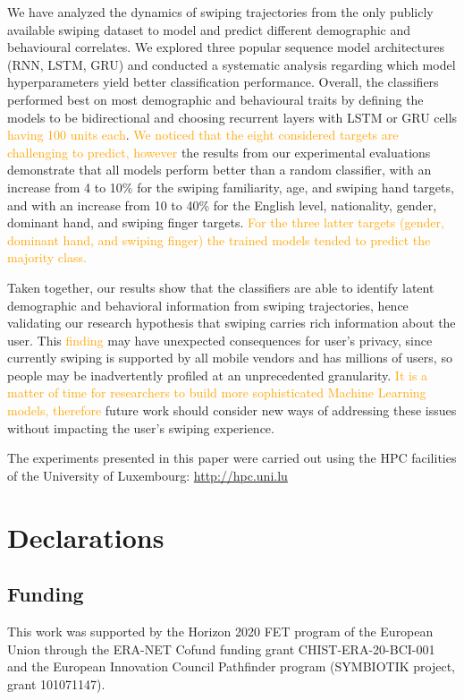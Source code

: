 \documentclass[sn-mathphys, pdflatex]{sn-jnl}
\newcommand{\rev}[1]{\textcolor{orange}{#1}}
\begin{document}
We have analyzed the dynamics of swiping trajectories from the only publicly available swiping dataset
to model and predict different demographic and behavioural correlates.
We explored three popular sequence model architectures (RNN, LSTM, GRU)
and conducted a systematic analysis regarding which model hyperparameters yield better classification performance.
Overall, the classifiers performed best on most demographic and behavioural traits
by defining the models to be bidirectional and choosing recurrent layers with LSTM or GRU cells \rev{having 100 units each}.
\rev{We noticed that the eight considered targets are challenging to predict, however}
the results from our experimental evaluations demonstrate that all models perform better than a random classifier,
with an increase from 4 to 10\% for the swiping familiarity, age, and swiping hand targets,
and with an increase from 10 to 40\% for the English level, nationality, gender, dominant hand, and swiping finger targets.
\rev{For the three latter targets (gender, dominant hand, and swiping finger)
the trained models tended to predict the majority class.}

Taken together, our results show that the classifiers are able to identify latent demographic and behavioral information from swiping trajectories,
hence validating our research hypothesis that swiping carries rich information about the user.
This \rev{finding} may have unexpected consequences for user's privacy,
since currently swiping is supported by all mobile vendors and has millions of users,
so people may be inadvertently profiled at an unprecedented granularity.
\rev{It is a matter of time for researchers to build more sophisticated Machine Learning models, therefore}
future work should consider new ways of addressing these issues without impacting the user's swiping experience.

\backmatter

The experiments presented in this paper were carried out
using the HPC facilities of the University of Luxembourg: \url{http://hpc.uni.lu}

\section*{Declarations}

\subsection*{Funding}
This work was supported by the Horizon 2020 FET program of the European Union through the ERA-NET Cofund funding grant CHIST-ERA-20-BCI-001 and the European Innovation Council Pathfinder program (SYMBIOTIK project, grant 101071147).
\end{document}
